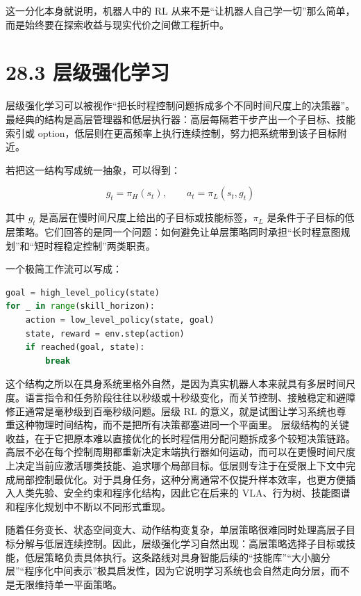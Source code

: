 这一分化本身就说明，机器人中的 RL 从来不是“让机器人自己学一切”那么简单，而是始终要在探索收益与现实代价之间做工程折中。

\section*{28.3 层级强化学习}


层级强化学习可以被视作“把长时程控制问题拆成多个不同时间尺度上的决策器”。最经典的结构是高层管理器和低层执行器：高层每隔若干步产出一个子目标、技能索引或 option，低层则在更高频率上执行连续控制，努力把系统带到该子目标附近。

若把这一结构写成统一抽象，可以得到：

\begin{equation*}
g_t = \pi_H(s_t), \qquad a_t = \pi_L(s_t, g_t)
\end{equation*}

其中 \(g_t\) 是高层在慢时间尺度上给出的子目标或技能标签，\(\pi_L\) 是条件于子目标的低层策略。它们回答的是同一个问题：如何避免让单层策略同时承担“长时程意图规划”和“短时程稳定控制”两类职责。

一个极简工作流可以写成：

\begin{lstlisting}[language=python]
goal = high_level_policy(state)
for _ in range(skill_horizon):
    action = low_level_policy(state, goal)
    state, reward = env.step(action)
    if reached(goal, state):
        break
\end{lstlisting}

这个结构之所以在具身系统里格外自然，是因为真实机器人本来就具有多层时间尺度。语言指令和任务阶段往往以秒级或十秒级变化，而关节控制、接触稳定和避障修正通常是毫秒级到百毫秒级问题。层级 RL 的意义，就是试图让学习系统也尊重这种物理时间结构，而不是把所有决策都塞进同一个平面里。 层级结构的关键收益，在于它把原本难以直接优化的长时程信用分配问题拆成多个较短决策链路。高层不必在每个控制周期都重新决定末端执行器如何运动，而可以在更慢时间尺度上决定当前应激活哪类技能、追求哪个局部目标。低层则专注于在受限上下文中完成局部控制最优化。对于具身任务，这种分离通常不仅提升样本效率，也更方便插入人类先验、安全约束和程序化结构，因此它在后来的 VLA、行为树、技能图谱和程序化规划中不断以不同形式重现。

随着任务变长、状态空间变大、动作结构变复杂，单层策略很难同时处理高层子目标分解与低层连续控制。因此，层级强化学习自然出现：高层策略选择子目标或技能，低层策略负责具体执行。这条路线对具身智能后续的“技能库”“大小脑分层”“程序化中间表示”极具启发性，因为它说明学习系统也会自然走向分层，而不是无限维持单一平面策略。

